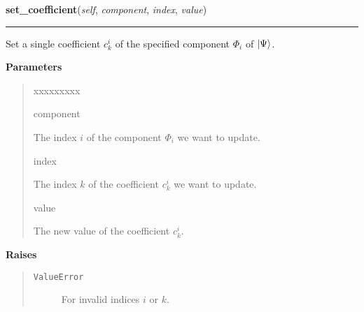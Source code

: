     \label{HagedornWavepacket:HagedornWavepacket:set_coefficient}

    \vspace{0.5ex}

\hspace{.8\funcindent}\begin{boxedminipage}{\funcwidth}

    \raggedright \textbf{set\_coefficient}(\textit{self}, \textit{component}, \textit{index}, \textit{value})

    \vspace{-1.5ex}

    \rule{\textwidth}{0.5\fboxrule}
\setlength{\parskip}{2ex}
    Set a single coefficient $c^i_k$ of the specified
    component $\Phi_i$ of
    $\Ket{\Psi}$.

\setlength{\parskip}{1ex}
      \textbf{Parameters}
      \vspace{-1ex}

      \begin{quote}
        \begin{Ventry}{xxxxxxxxx}

          \item[component]

          The index $i$ of the component $\Phi_i$ we
          want to update.

          \item[index]

          The index $k$ of the coefficient $c^i_k$ we
          want to update.

          \item[value]

          The new value of the coefficient $c^i_k$.

        \end{Ventry}

      \end{quote}

      \textbf{Raises}
    \vspace{-1ex}

      \begin{quote}
        \begin{description}

          \item[\texttt{ValueError}]

          For invalid indices $i$ or $k$.

        \end{description}

      \end{quote}

    \end{boxedminipage}

